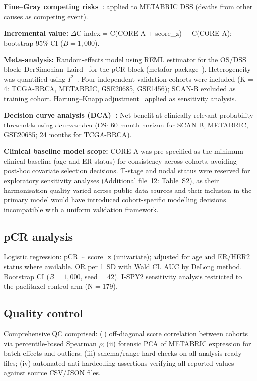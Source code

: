 \documentclass[referee,lineno,pdflatex,sn-vancouver-num]{sn-jnl}
\begin{document}
\textbf{Fine--Gray competing risks~\cite{fine1999}:} applied to METABRIC DSS (deaths from other causes as competing event).

\textbf{Incremental value:} $\Delta$C-index = C(CORE-A + score\_z) $-$ C(CORE-A); bootstrap 95\% CI ($B = 1{,}000$).

\textbf{Meta-analysis:} Random-effects model using REML estimator for the OS/DSS block; DerSimonian--Laird~\cite{dersimonian1986} for the pCR block (metafor package~\cite{viechtbauer2010}). Heterogeneity was quantified using $I^2$~\cite{higgins2003}. Four independent validation cohorts were included (K = 4: TCGA-BRCA, METABRIC, GSE20685, GSE1456); SCAN-B excluded as training cohort. Hartung--Knapp adjustment~\cite{hartung2001} applied as sensitivity analysis.

\textbf{Decision curve analysis (DCA)~\cite{vickers2006}:} Net benefit at clinically relevant probability thresholds using dcurves::dca (OS: 60-month horizon for SCAN-B, METABRIC, GSE20685; 24 months for TCGA-BRCA).

\textbf{Clinical baseline model scope:} CORE-A was pre-specified as the minimum clinical baseline (age and ER status) for consistency across cohorts, avoiding post-hoc covariate selection decisions. T-stage and nodal status were reserved for exploratory sensitivity analyses (Additional file~12: Table~S2), as their harmonisation quality varied across public data sources and their inclusion in the primary model would have introduced cohort-specific modelling decisions incompatible with a uniform validation framework.

\subsection{pCR analysis}\label{subsec:pcr-analysis}

Logistic regression: pCR $\sim$ score\_z (univariate); adjusted for age and ER/HER2 status where available. OR per 1~SD with Wald CI. AUC by DeLong method. Bootstrap CI ($B = 1{,}000$, seed = 42). I-SPY2 sensitivity analysis restricted to the paclitaxel control arm (N = 179).

\subsection{Quality control}\label{subsec:quality-control}

Comprehensive QC comprised: (i) off-diagonal score correlation between cohorts via percentile-based Spearman $\rho$; (ii) forensic PCA of METABRIC expression for batch effects and outliers; (iii) schema/range hard-checks on all analysis-ready files; (iv) automated anti-hardcoding assertions verifying all reported values against source CSV/JSON files.
\end{document}
